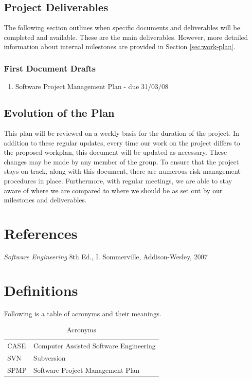 \documentclass{article}
\begin{document}
\subsection{Project Deliverables}

The following section outlines when specific documents and deliverables will be completed and available. These are the main deliverables. However, more detailed information about internal milestones are provided in Section \ref{sec:work-plan}.

\subsubsection{First Document Drafts}

\begin{enumerate}
\item Software Project Management Plan - due 31/03/08
\end{enumerate}

\subsection{Evolution of the Plan}

This plan will be reviewed on a weekly basis for the duration of the project. In addition to these regular updates, every time our work on the project differs to the proposed workplan, this document will be updated as necessary. These changes may be made by any member of the group. To ensure that the project stays on track, along with this document, there are numerous risk management procedures in place. Furthermore, with regular meetings, we are able to stay aware of where we are compared to where we should be as set out by our milestones and deliverables.\\

\section{References}

\textit{Software Engineering} 8th Ed., I. Sommerville, Addison-Wesley, 2007\\

\section{Definitions}

Following is a table of acronyms and their meanings.

\begin{table}[htp]
\begin{centering}
\begin{tabular}{| l | l |}
\hline 
CASE & Computer Assisted Software Engineering\\
SVN & Subversion\\
SPMP & Software Project Management Plan\\
\hline
\end{tabular}
\par\end{centering}


\caption{Acronyms}
\end{table}
\end{document}
